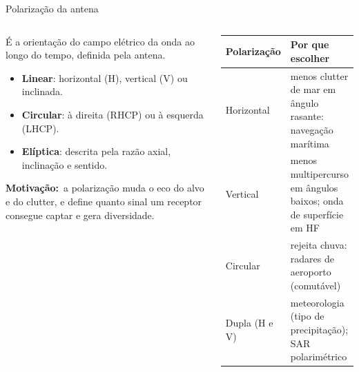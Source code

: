 \documentclass[aspectratio=169, 10pt]{beamer}
\newcommand{\eqpanel}[1]{%
  \begin{tikzpicture}
    \node[fill=bgcard, draw=radarcyan!40, line width=0.6pt, rounded corners=4pt,
          text width=\textwidth-12pt, inner sep=6pt, align=left, font=\small]{#1};
  \end{tikzpicture}%
}
\newcommand{\rot}[2]{\textbf{\textcolor{#1}{#2}}}
\newcommand{\motiv}{\rot{accentgold}{Motivação:}\ }
\let\eqpanelmodelo\eqpanel
\renewcommand{\eqpanel}[1]{\par\eqpanelmodelo{#1}\par}
\newcommand{\eqc}[1]{{\centering$\displaystyle #1$\par}}
\newcommand{\cab}[1]{\textbf{\textcolor{radarcyan}{#1}}}
\begin{document}
\begin{frame}[t]{Polarização da antena}
  \footnotesize
  \begin{columns}[T,onlytextwidth]
    \begin{column}{0.49\textwidth}
      É a orientação do campo elétrico da onda ao longo do tempo, definida pela antena.
      \vspace{2pt}


      \begin{itemize}\setlength{\itemsep}{1pt}
        \item \textbf{Linear}: horizontal (H), vertical (V) ou inclinada.
        \item \textbf{Circular}: à direita (RHCP) ou à esquerda (LHCP).
        \item \textbf{Elíptica}: descrita pela razão axial, inclinação e sentido.
      \end{itemize}
      \motiv a polarização muda o eco do alvo e do clutter, e define quanto sinal um receptor consegue captar e gera diversidade.
    \end{column}
    \begin{column}{0.49\textwidth}
      \renewcommand{\arraystretch}{1.15}
      \begin{tabular}{@{}L{1.7cm}L{4.4cm}@{}}
        \toprule
        \cab{Polarização} & \cab{Por que escolher} \\
        \midrule
        Horizontal & menos clutter de mar em ângulo rasante: navegação marítima \\
        Vertical & menos multipercurso em ângulos baixos; onda de superfície em HF \\        
        Circular & rejeita chuva: radares de aeroporto (comutável) \\
        Dupla (H e V) & meteorologia (tipo de precipitação); SAR polarimétrico \\
        \bottomrule
      \end{tabular}
      \vspace{3pt}
    \end{column}
  \end{columns}
\end{frame}
\end{document}

